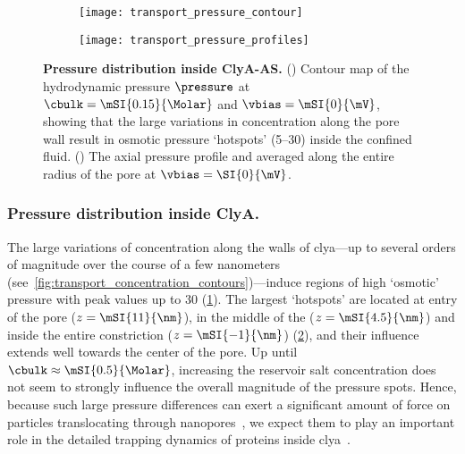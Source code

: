 %
\begin{figure*}[t]
  \centering
  
  \begin{subfigure}[t]{6cm}
    \centering
    \caption{}\vspace{-3mm}\label{fig:transport_pressure_contour}
    \texttt{[image: transport\_pressure\_contour]}
  \end{subfigure}
  \hspace{-5mm}
  \begin{subfigure}[t]{4.5cm}
    \centering
    \caption{}\vspace{-3mm}\label{fig:transport_pressure_profiles}
    \texttt{[image: transport\_pressure\_profiles]}
  \end{subfigure}

  \caption[Pressure distribution inside {ClyA-AS}]
  {%
    \textbf{Pressure distribution inside {ClyA-AS}.}
    ()
    Contour map of the hydrodynamic pressure $\pressure$ at $\cbulk = \mSI{0.15}{\Molar}$ and
    $\vbias=\mSI{0}{\mV}$, showing that the large variations in \Na{} concentration along the pore wall result
    in osmotic pressure `hotspots' (\SIrange{5}{30}{\atm}) inside the confined fluid.
    ()
    The axial pressure profile and averaged along the entire radius of the pore at $\vbias=\SI{0}{\mV}$.
  }\label{fig:transport_pressure}

\end{figure*}
%


\subsubsection{Pressure distribution inside ClyA.}
%
The large variations of \Na{} concentration along the walls of \gls{clya}---up to several orders of magnitude
over the course of a few nanometers (see~\cref{fig:transport_concentration_contours})---induce regions of high
`osmotic' pressure with peak values up to \SI{30}{\atm} (\cref{fig:transport_pressure_contour}). The largest
`hotspots' are located at \cisi{} entry of the pore ($z = \mSI{11}{\nm}$), in the middle of the \lumen{} ($z =
\mSI{4.5}{\nm}$) and inside the entire constriction ($z = \mSI{-1}{\nm}$)
(\cref{fig:transport_pressure_profiles}), and their influence extends well towards the center of the pore. Up
until $\cbulk \approx \mSI{0.5}{\Molar}$, increasing the reservoir salt concentration does not seem to
strongly influence the overall magnitude of the pressure spots. Hence, because such large pressure differences
can  exert a significant amount of force on particles translocating through nanopores~\cite{Hoogerheide-2014},
we expect them to play an important role in the detailed trapping dynamics of proteins inside
\gls{clya}~\cite{Soskine-Biesemans-2015,Willems-Ruic-Biesemans-2019}.


